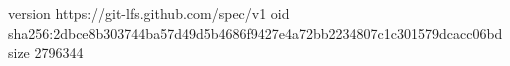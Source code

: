 version https://git-lfs.github.com/spec/v1
oid sha256:2dbce8b303744ba57d49d5b4686f9427e4a72bb2234807c1c301579dcacc06bd
size 2796344
